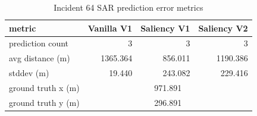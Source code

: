 \begin{table}[ht]
\centering
\caption{Incident 64 SAR prediction error metrics}
\label{tab:sar-incident-64}
\begin{tabular}{lrrr}
\hline
metric & Vanilla V1 & Saliency V1 & Saliency V2 \\
\hline
prediction count & 3 & 3 & 3 \\
avg distance (m) & 1365.364 & 856.011 & 1190.386 \\
stddev (m) & 19.440 & 243.082 & 229.416 \\
ground truth x (m) & \multicolumn{3}{c}{971.891} \\
ground truth y (m) & \multicolumn{3}{c}{296.891} \\
\hline
\end{tabular}
\end{table}
